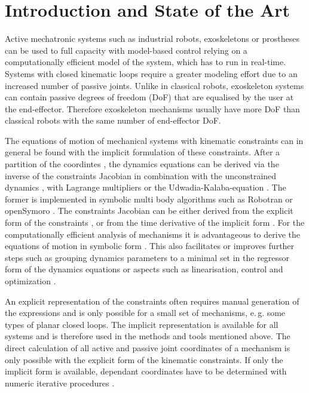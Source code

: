 \documentclass{svproc}
\begin{document}
\section{Introduction and State of the Art}

Active mechatronic systems such as industrial robots, exoskeletons or prostheses can be used to full capacity with model-based control relying on a computationally efficient model of the system, which has to run in real-time.
Systems with closed kinematic loops require a greater modeling effort due to an increased number of passive joints.
Unlike in classical robots, exoskeleton systems can contain passive degrees of freedom (DoF) that are equalised by the user at the end-effector.
Therefore exoskeleton mechanisms usually have more DoF than classical robots with the same number of end-effector DoF.

The equations of motion of mechanical systems with kinematic constraints can in general be found with the implicit formulation of these constraints.
After a partition of the coordintes \cite{WehageHau1982}, the dynamics equations can be derived via the inverse of the constraints Jacobian in combination with the unconstrained dynamics \cite{NakamuraGho1989}, with Lagrange multipliers \cite{WehageHau1982,LuhZhe1985} or the Udwadia-Kalaba-equation \cite{UdwadiaKal1992}.
The former is implemented in symbolic multi body algorithms such as Robotran \cite{SaminFis2013} or openSymoro \cite{KhalilVijKhoMuk2014}.
The constraints Jacobian can be either derived from the explicit form of the constraints \cite{NakamuraGho1989}, or from the time derivative of the implicit form \cite{ParkChoPlo1999}.
%
For the computationally efficient analysis of mechanisms it is advantageous to derive the equations of motion in symbolic form \cite{SaminFis2013}.
This also facilitates or improves further steps such as grouping dynamics parameters to a minimal set  in the regressor form of the dynamics equations \cite{KhalilBen1995} or aspects such as linearisation, control and optimization \cite{ParkChoPlo1999}.

An explicit representation of the constraints often requires manual generation of the expressions and is only possible for a small set of mechanisms, e.\,g. some types of planar closed loops.
The implicit representation is available for all systems and is therefore used in the methods and tools mentioned above.
%
The direct calculation of all active and passive joint coordinates of a mechanism is only possible with the explicit form of the kinematic constraints.
If only the implicit form is available, dependant coordinates have to be determined with numeric iterative procedures \cite{ParkChoPlo1999}.
\end{document}
